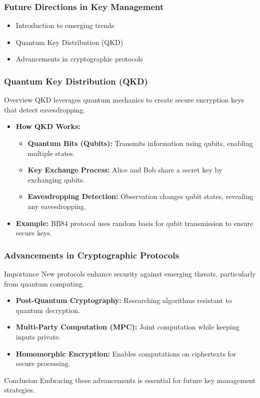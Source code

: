\documentclass{beamer}
\begin{document}
\begin{frame}[fragile]
    \frametitle{Future Directions in Key Management}
    \begin{itemize}
        \item Introduction to emerging trends
        \item Quantum Key Distribution (QKD)
        \item Advancements in cryptographic protocols
    \end{itemize}
\end{frame}

\begin{frame}[fragile]
    \frametitle{Quantum Key Distribution (QKD)}
    \begin{block}{Overview}
        QKD leverages quantum mechanics to create secure encryption keys that detect eavesdropping.
    \end{block}
    \begin{itemize}
        \item \textbf{How QKD Works:}
        \begin{itemize}
            \item \textbf{Quantum Bits (Qubits):} Transmits information using qubits, enabling multiple states.
            \item \textbf{Key Exchange Process:} Alice and Bob share a secret key by exchanging qubits.
            \item \textbf{Eavesdropping Detection:} Observation changes qubit states, revealing any eavesdropping.
        \end{itemize}
        \item \textbf{Example:} BB84 protocol uses random basis for qubit transmission to ensure secure keys.
    \end{itemize}
\end{frame}

\begin{frame}[fragile]
    \frametitle{Advancements in Cryptographic Protocols}
    \begin{block}{Importance}
        New protocols enhance security against emerging threats, particularly from quantum computing.
    \end{block}
    \begin{itemize}
        \item \textbf{Post-Quantum Cryptography:} Researching algorithms resistant to quantum decryption.
        \item \textbf{Multi-Party Computation (MPC):} Joint computation while keeping inputs private.
        \item \textbf{Homomorphic Encryption:} Enables computations on ciphertexts for secure processing.
    \end{itemize}
    \begin{block}{Conclusion}
        Embracing these advancements is essential for future key management strategies.
    \end{block}
\end{frame}
\end{document}
